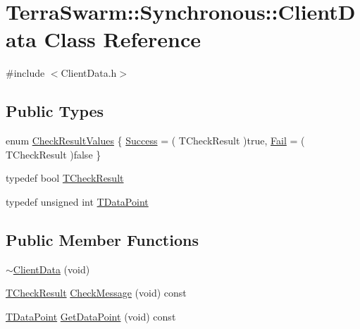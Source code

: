 \hypertarget{class_terra_swarm_1_1_synchronous_1_1_client_data}{\section{Terra\-Swarm\-:\-:Synchronous\-:\-:Client\-Data Class Reference}
\label{class_terra_swarm_1_1_synchronous_1_1_client_data}
}


{\ttfamily \#include $<$Client\-Data.\-h$>$}

\subsection*{Public Types}
\begin{DoxyCompactItemize}
\item 
enum \hyperlink{class_terra_swarm_1_1_synchronous_1_1_client_data_ab069b9069716e25b2e5be34d2356ec01}{Check\-Result\-Values} \{ \hyperlink{class_terra_swarm_1_1_synchronous_1_1_client_data_ab069b9069716e25b2e5be34d2356ec01a655e724c0fe6463a22105e8c629a345d}{Success} = ( T\-Check\-Result )true, 
\hyperlink{class_terra_swarm_1_1_synchronous_1_1_client_data_ab069b9069716e25b2e5be34d2356ec01a12ebd40706bb9823852ae1688e87e831}{Fail} = ( T\-Check\-Result )false
 \}
\item 
typedef bool \hyperlink{class_terra_swarm_1_1_synchronous_1_1_client_data_a2a4af9153f7e8fe6cadba6a188ce2207}{T\-Check\-Result}
\item 
typedef unsigned int \hyperlink{class_terra_swarm_1_1_synchronous_1_1_client_data_a6c581f1f80217390ea8fe95136c60f07}{T\-Data\-Point}
\end{DoxyCompactItemize}
\subsection*{Public Member Functions}
\begin{DoxyCompactItemize}
\item 
\hyperlink{class_terra_swarm_1_1_synchronous_1_1_client_data_a67bc913ce1ebd9641da07bdc09e4444e}{$\sim$\-Client\-Data} (void)
\item 
\hyperlink{class_terra_swarm_1_1_synchronous_1_1_client_data_a2a4af9153f7e8fe6cadba6a188ce2207}{T\-Check\-Result} \hyperlink{class_terra_swarm_1_1_synchronous_1_1_client_data_a49c4a96e9b957c237f40aad39e7cb328}{Check\-Message} (void) const 
\item 
\hyperlink{class_terra_swarm_1_1_synchronous_1_1_client_data_a6c581f1f80217390ea8fe95136c60f07}{T\-Data\-Point} \hyperlink{class_terra_swarm_1_1_synchronous_1_1_client_data_ac71da8ed6f56cfdac3f01131f6bef342}{Get\-Data\-Point} (void) const 
\end{DoxyCompactItemize}

